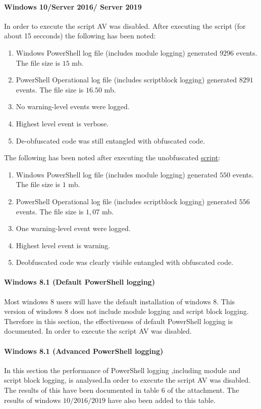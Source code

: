 \documentclass{article}%
\begin{document}
\paragraph{Windows 10/Server 2016/ Server 2019}
In order to execute the script AV was disabled. After executing the script (for about 15 secconds) the following has been noted:
\begin{enumerate}
	\item Windows PowerShell log file (includes module logging) generated $9296$ events. The file size is $15$ mb.
	\item PowerShell Operational log file (includes scriptblock logging) generated $8291$ events. The file size is $16.50$ mb.
	\item No warning-level events were logged.
	\item Highest level event is verbose.
	\item De-obfuscated code was still entangled with obfuscated code.
\end{enumerate}
The following has been noted after executing the unobfuscated \hyperlink{script2}{script}:
\begin{enumerate}
	\item Windows PowerShell log file (includes module logging) generated $550$ events. The file size is $1$ mb.
	\item PowerShell Operational log file (includes scriptblock logging) generated $556$ events. The file size is $1,07$ mb.
	\item One warning-level event were logged.
	\item Highest level event is warning.
	\item Deobfuscated code was clearly visible entangled with obfuscated code.
\end{enumerate}

\paragraph{Windows 8.1 (Default PowerShell logging)}\hfill\newline
Most windows $8$ users will have the default installation of windows 8. This version of windows $8$ does not include module logging and script block logging. Therefore in this section, the effectiveness of default PowerShell logging is documented.
In order to execute the script AV was disabled.

\paragraph{Windows 8.1 (Advanced PowerShell logging)}\hfill\newline
In this section the performance of PowerShell logging ,including module and script block logging, is analysed.In order to execute the script AV was disabled.
The results of this have been documented in table $6$ of the attachment. The results of windows $10/2016/2019$ have also been added to this table.
\end{document}
